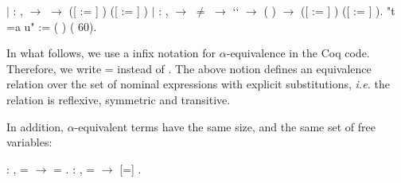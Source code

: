 \begin{coqdoccode}
\coqdocnoindent
\ensuremath{|}  : \coqdockw{\ensuremath{\forall}}     ,    \ensuremath{\rightarrow}    \ensuremath{\rightarrow}  ([ := ] ) ([ := ] )\coqdoceol
\coqdocnoindent
\ensuremath{|}  : \coqdockw{\ensuremath{\forall}}      ,    \ensuremath{\rightarrow}  \ensuremath{\not=}  \ensuremath{\rightarrow}  ``   \ensuremath{\rightarrow}   (   ) \ensuremath{\rightarrow}\coqdoceol
\coqdocindent{1.00em}
 ([ := ] ) ([ := ] ).\coqdoceol
\coqdocnoindent
{} "t =a u" := (  ) (  60).\coqdoceol
\coqdocemptyline
\end{coqdoccode}
In what follows, we use a infix notation for $\alpha$-equivalence in the Coq code. Therefore, we write  =  instead of   . The above notion defines an equivalence relation over the set  of nominal expressions with explicit substitutions, {\it i.e.} the  relation is reflexive, symmetric and transitive. 
\begin{coqdoccode}
\end{coqdoccode}
In addition, $\alpha$-equivalent terms have the same size, and the same set of free variables: 
\begin{coqdoccode}
\coqdocemptyline
\coqdocnoindent
{} : \coqdockw{\ensuremath{\forall}}  ,  =  \ensuremath{\rightarrow}   =  .\coqdoceol
\coqdocemptyline
\coqdocnoindent
{}  : \coqdockw{\ensuremath{\forall}}  ,  =  \ensuremath{\rightarrow}   [=]  .\coqdoceol
\coqdocemptyline
\coqdocemptyline
\end{coqdoccode}
